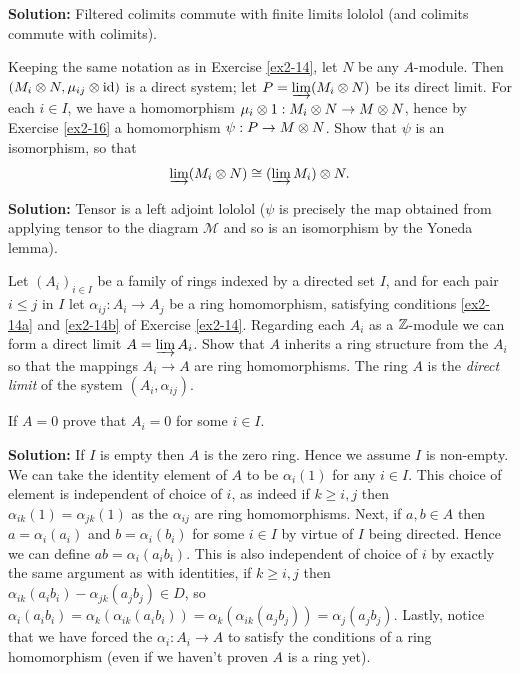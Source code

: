 \documentclass{article}
\begin{document}
\noindent\textbf{Solution:}
Filtered colimits commute with finite limits lololol (and colimits commute with colimits).

\begin{exercise}
    Keeping the same notation as in Exercise \ref{ex2-14}, let \(N\) be any \(A\)-module.
    Then \((M_i \otimes N, \mu_{ij} \otimes \mathrm{id})\) is a direct system; let \(P = \varinjlim (M_i \otimes N)\) be its direct limit.
    For each \(i \in I\), we have a homomorphism \(\mu_i \otimes 1 : M_i \otimes N \to M \otimes N\), hence by Exercise \ref{ex2-16} a homomorphism \(\psi : P \to M \otimes N\).
    Show that \(\psi\) is an isomorphism, so that
    \[
        \varinjlim (M_i \otimes N) \cong (\varinjlim M_i) \otimes N.
    \]
\end{exercise}

\noindent\textbf{Solution:}
Tensor is a left adjoint lololol (\(\psi\) is precisely the map obtained from applying tensor to the diagram \(\mathcal{M}\) and so is an isomorphism by the Yoneda lemma).

\begin{exercise}
    Let \((A_i)_{i \in I}\) be a family of rings indexed by a directed set \(I\), and for each pair \(i \leq j\) in \(I\) let \(\alpha_{ij} : A_i \to A_j\) be a ring homomorphism, satisfying conditions \ref{ex2-14a} and \ref{ex2-14b} of Exercise \ref{ex2-14}.
    Regarding each \(A_i\) as a \(\mathbb{Z}\)-module we can form a direct limit \(A = \varinjlim A_i\).
    Show that \(A\) inherits a ring structure from the \(A_i\) so that the mappings \(A_i \to A\) are ring homomorphisms.
    The ring \(A\) is the \textit{direct limit} of the system \((A_i, \alpha_{ij})\).

    If \(A = 0\) prove that \(A_i = 0\) for some \(i \in I\).
\end{exercise}

\noindent\textbf{Solution:}
If \(I\) is empty then \(A\) is the zero ring.
Hence we assume \(I\) is non-empty.
We can take the identity element of \(A\) to be \(\alpha_i(1)\) for any \(i \in I\).
This choice of element is independent of choice of \(i\), as indeed if \(k \geq i, j\) then \(\alpha_{ik}(1) = \alpha_{jk}(1)\) as the \(\alpha_{ij}\) are ring homomorphisms.
Next, if \(a, b \in A\) then \(a = \alpha_i(a_i)\) and \(b = \alpha_i(b_i)\) for some \(i \in I\) by virtue of \(I\) being directed.
Hence we can define \(ab = \alpha_i(a_i b_i)\).
This is also independent of choice of \(i\) by exactly the same argument as with identities, if \(k \geq i, j\) then \(\alpha_{ik} (a_i b_i) - \alpha_{jk}(a_j b_j) \in D\), so \(\alpha_i(a_i b_i) = \alpha_k(\alpha_{ik}(a_i b_i)) = \alpha_k(\alpha_{ik}(a_j b_j)) = \alpha_j (a_j b_j)\).
Lastly, notice that we have forced the \(\alpha_i : A_i \to A\) to satisfy the conditions of a ring homomorphism (even if we haven't proven \(A\) is a ring yet).
\end{document}
